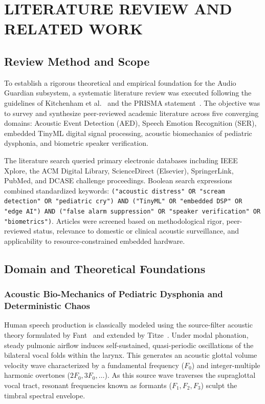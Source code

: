 \documentclass[12pt, a4paper]{report}
\begin{document}
\chapter{LITERATURE REVIEW AND RELATED WORK}

\section{Review Method and Scope}
To establish a rigorous theoretical and empirical foundation for the Audio Guardian subsystem, a systematic literature review was executed following the guidelines of Kitchenham et al.~\cite{ref_kitchenham2007} and the PRISMA statement~\cite{ref_prisma2020}. The objective was to survey and synthesize peer-reviewed academic literature across five converging domains: Acoustic Event Detection (AED), Speech Emotion Recognition (SER), embedded TinyML digital signal processing, acoustic biomechanics of pediatric dysphonia, and biometric speaker verification.

The literature search queried primary electronic databases including IEEE Xplore, the ACM Digital Library, ScienceDirect (Elsevier), SpringerLink, PubMed, and DCASE challenge proceedings. Boolean search expressions combined standardized keywords: \texttt{("acoustic distress" OR "scream detection" OR "pediatric cry") AND ("TinyML" OR "embedded DSP" OR "edge AI") AND ("false alarm suppression" OR "speaker verification" OR "biometrics")}. Articles were screened based on methodological rigor, peer-reviewed status, relevance to domestic or clinical acoustic surveillance, and applicability to resource-constrained embedded hardware.

\section{Domain and Theoretical Foundations}

\subsection{Acoustic Bio-Mechanics of Pediatric Dysphonia and Deterministic Chaos}
Human speech production is classically modeled using the source-filter acoustic theory formulated by Fant~\cite{ref_fant1960} and extended by Titze~\cite{ref_titze2000}. Under modal phonation, steady pulmonic airflow induces self-sustained, quasi-periodic oscillations of the bilateral vocal folds within the larynx. This generates an acoustic glottal volume velocity wave characterized by a fundamental frequency ($F_0$) and integer-multiple harmonic overtones ($2F_0, 3F_0, \dots$). As this source wave traverses the supraglottal vocal tract, resonant frequencies known as formants ($F_1, F_2, F_3$) sculpt the timbral spectral envelope.
\end{document}
